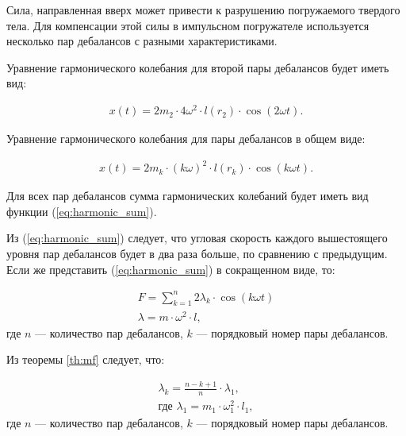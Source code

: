 Сила, направленная вверх может привести к разрушению погружаемого твердого тела.
Для компенсации этой силы в импульсном погружателе используется несколько пар дебалансов с разными характеристиками.

Уравнение гармонического колебания для второй пары дебалансов будет иметь вид:

\begin{equation*}
    \begin{aligned}
        x(t) = 2 m_2 \cdot 4 \omega^2 \cdot l(r_2) \cdot \cos (2 \omega t).
    \end{aligned}
\end{equation*}

Уравнение гармонического колебания для пары дебалансов в общем виде:

\begin{equation}\label{eq:harmonic_common}
    \begin{aligned}
        x(t) = 2 m_k \cdot (k \omega)^2 \cdot l(r_k) \cdot \cos (k \omega t).
    \end{aligned}
\end{equation}

Для всех пар дебалансов сумма гармонических колебаний будет иметь вид функции (\ref{eq:harmonic_sum}).

Из (\ref{eq:harmonic_sum}) следует, что угловая скорость каждого вышестоящего уровня пар дебалансов будет в два раза больше, по сравнению с предыдущим.
Если же представить (\ref{eq:harmonic_sum}) в сокращенном виде, то:

\begin{equation}\label{eq:short_harmonic_sum}
    \begin{gathered}
        F = \sum\limits_{k = 1}^n 2 \lambda_k \cdot \cos (k \omega t) \\
        \lambda = m \cdot \omega^2 \cdot l,
    \end{gathered}
\end{equation}
\noindent где $n$ --- количество пар дебалансов, $k$ --- порядковый номер пары дебалансов.

Из теоремы \ref{th:mf} следует, что:

\begin{equation}\label{eq:opt_attitude}
    \begin{gathered}
        \lambda_k = \frac{n - k + 1}{n} \cdot \lambda_1,\\
        \textrm{где } \lambda_1 = m_1 \cdot \omega_{1}^{2} \cdot l_1,
    \end{gathered}
\end{equation}
\noindent где $n$ --- количество пар дебалансов, $k$ --- порядковый номер пары дебалансов.

